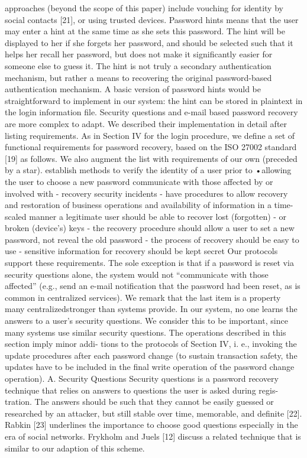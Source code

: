 approaches (beyond the scope of this paper) include vouching
for identity by social contacts [21], or using trusted devices.
 Password hints means that the user may enter a hint at
the same time as she sets this password. The hint will be
displayed to her if she forgets her password, and should be
selected such that it helps her recall her password, but does
not make it significantly easier for someone else to guess it.
The hint is not truly a secondary authentication mechanism,
but rather a means to recovering the original password-based
authentication mechanism. A basic version of password hints
would be straightforward to implement in our system: the
hint can be stored in plaintext in the login information file.
Security questions and e-mail based password recovery are
more complex to adapt. We described their implementation in
detail after listing requirements.
 As in Section IV for the login procedure, we define a set of
functional requirements for password recovery, based on the
ISO 27002 standard [19] as follows. We also augment the list
with requirements of our own (preceded by a star).
establish methods to verify the identity of a user prior to
•allowing the user to choose a new password
communicate with those affected by or involved with
 - recovery security incidents
 - have procedures to allow recovery and restoration of
business operations and availability of information in a
 time-scaled manner
a legitimate user should be able to recover lost (forgotten)
 - or broken (device’s) keys
 - the recovery procedure should allow a user to set a new
 password, not reveal the old password
 - the process of recovery should be easy to use
 - sensitive information for recovery should be kept secret
Our protocols support these requirements. The sole exception
is that if a password is reset via security questions alone, the
system would not “communicate with those affected” (e.g.,
send an e-mail notification that the password had been reset,
as is common in centralized services). We remark that the
last item is a property many centralizedstronger than systems
provide. In our system, no one learns the answers to a user’s
security questions. We consider this to be important, since
many systems use similar security questions.
 The operations described in this section imply minor addi-
tions to the protocols of Section IV, i. e., invoking the update
procedures after each password change (to sustain transaction
safety, the updates have to be included in the final write
operation of the password change operation).
A. Security Questions
 Security questions is a password recovery technique that
relies on answers to questions the user is asked during regis-
tration. The answers should be such that they cannot be easily
guessed or researched by an attacker, but still stable over
time, memorable, and definite [22]. Rabkin [23] underlines
the importance to choose good questions especially in the era
of social networks. Frykholm and Juels [12] discuss a related
technique that is similar to our adaption of this scheme.
 


